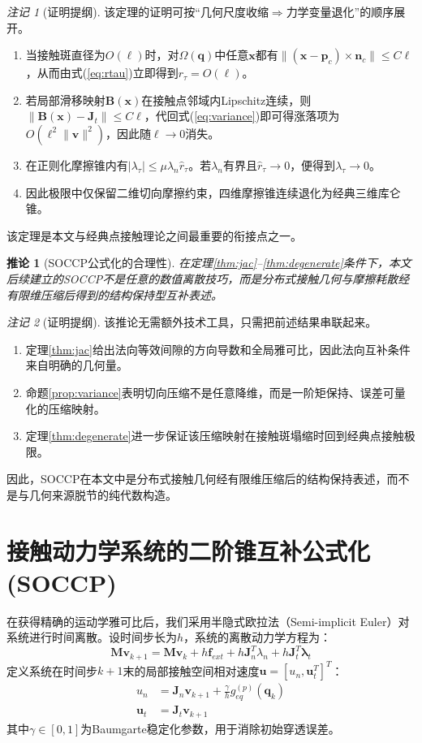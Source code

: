 ﻿\documentclass[12pt, a4paper]{ctexart}
\theoremstyle{plain}
\newtheorem{corollary}{推论}
\theoremstyle{remark}
\newtheorem{remark}{注记}
\begin{document}
\begin{remark}[证明提纲]
该定理的证明可按“几何尺度收缩$ \Rightarrow $力学变量退化”的顺序展开。
\begin{enumerate}
    \item 当接触斑直径为$O(\ell)$时，对$\Omega(\bm{q})$中任意$\bm{x}$都有$\| ( \bm{x} - \bm{p}_c ) \times \bm{n}_c \| \le C\ell$，从而由式(\ref{eq:rtau})立即得到$r_{\tau} = O(\ell)$。
    \item 若局部滑移映射$\bm{B}(\bm{x})$在接触点邻域内Lipschitz连续，则$\| \bm{B}(\bm{x}) - \bm{J}_t \| \le C\ell$，代回式(\ref{eq:variance})即可得涨落项为$O(\ell^2 \|\bm{v}\|^2)$，因此随$\ell \to 0$消失。
    \item 在正则化摩擦锥内有$|\lambda_\tau| \le \mu \lambda_n \hat{r}_\tau$。若$\lambda_n$有界且$\hat{r}_\tau \to 0$，便得到$\lambda_\tau \to 0$。
    \item 因此极限中仅保留二维切向摩擦约束，四维摩擦锥连续退化为经典三维库仑锥。
\end{enumerate}
该定理是本文与经典点接触理论之间最重要的衔接点之一。
\end{remark}

\begin{corollary}[SOCCP公式化的合理性]\label{cor:soccp}
在定理\ref{thm:jac}--\ref{thm:degenerate}条件下，本文后续建立的SOCCP不是任意的数值离散技巧，而是分布式接触几何与摩擦耗散经有限维压缩后得到的结构保持型互补表述。
\end{corollary}

\begin{remark}[证明提纲]
该推论无需额外技术工具，只需把前述结果串联起来。
\begin{enumerate}
    \item 定理\ref{thm:jac}给出法向等效间隙的方向导数和全局雅可比，因此法向互补条件来自明确的几何量。
    \item 命题\ref{prop:variance}表明切向压缩不是任意降维，而是一阶矩保持、误差可量化的压缩映射。
    \item 定理\ref{thm:degenerate}进一步保证该压缩映射在接触斑塌缩时回到经典点接触极限。
\end{enumerate}
因此，SOCCP在本文中是分布式接触几何经有限维压缩后的结构保持表述，而不是与几何来源脱节的纯代数构造。
\end{remark}

\section{接触动力学系统的二阶锥互补公式化 (SOCCP)}
在获得精确的运动学雅可比后，我们采用半隐式欧拉法（Semi-implicit Euler）对系统进行时间离散。设时间步长为$h$，系统的离散动力学方程为：
\begin{equation}
    \bm{M} \bm{v}_{k+1} = \bm{M} \bm{v}_k + h \bm{f}_{ext} + h \bm{J}_n^T \lambda_n + h \bm{J}_t^T \bm{\lambda}_t
\end{equation}
定义系统在时间步$k+1$末的局部接触空间相对速度$\bm{u} = [u_n, \bm{u}_t^T]^T$：
\begin{align}
    u_n &= \bm{J}_n \bm{v}_{k+1} + \frac{\gamma}{h} g_{eq}^{(p)}(\bm{q}_k) \\
    \bm{u}_t &= \bm{J}_t \bm{v}_{k+1}
\end{align}
其中$\gamma \in [0,1]$为Baumgarte稳定化参数，用于消除初始穿透误差。
\end{document}
